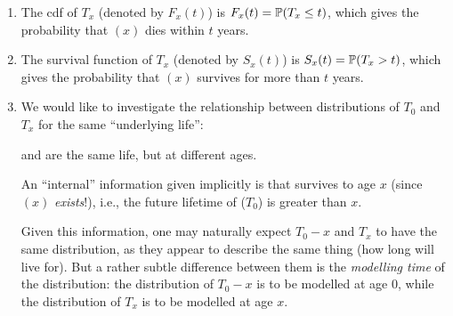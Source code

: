 \begin{enumerate}
\item The cdf of \(T_x\) (denoted by \(F_x(t)\)) is
\(F_x(t)=\mathbb{P}\qty(T_x\le t)\), which gives the probability that \((x)\) dies
within \(t\) years.

\item The survival function of \(T_x\) (denoted by \(S_x(t)\)) is
\(S_x(t)=\mathbb{P}\qty(T_x>t)\), which gives the probability that \((x)\) survives for
more than \(t\) years.

\item \label{it:key-assum} We would like to investigate the relationship between
distributions of \(T_0\) and \(T_x\) for the same ``underlying life'':



\begin{note}
 and  are the same life, but at different ages.
\end{note}

An ``internal'' information given implicitly is that 
survives to age \(x\) (since \((x)\) \emph{exists}!), i.e., the future lifetime
of  (\(T_0\)) is greater than \(x\).

Given this information, one may naturally expect \(T_0-x\) and \(T_x\) to have
the same distribution, as they appear to describe the same thing (how long
 will live for). But a rather subtle difference between them is
the \emph{modelling time} of the distribution: the distribution of \(T_0-x\) is
to be modelled at age 0, while the distribution of \(T_x\) is to be modelled at
age \(x\).


\end{enumerate}
